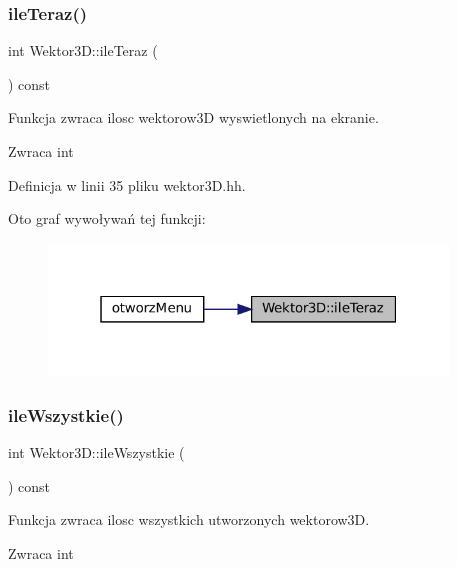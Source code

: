 \subsubsection{\texorpdfstring{ileTeraz()}{ileTeraz()}}
{\footnotesize\ttfamily int Wektor3\+D\+::ile\+Teraz (\begin{DoxyParamCaption}{ }\end{DoxyParamCaption}) const\hspace{0.3cm}{\ttfamily [inline]}}

Funkcja zwraca ilosc wektorow3D wyswietlonych na ekranie.

\begin{DoxyReturn}{Zwraca}
int 
\end{DoxyReturn}


Definicja w linii 35 pliku wektor3\+D.\+hh.

Oto graf wywoływań tej funkcji\+:\nopagebreak
\begin{figure}[H]
\begin{center}
\leavevmode
\includegraphics[width=301pt]{class_wektor3_d_a35bade70d5d9200b5e4fab3e7726f4c8_icgraph}
\end{center}
\end{figure}
\mbox{\label{class_wektor3_d_a93099f705273022e5c857dba3730d750}} 
\subsubsection{\texorpdfstring{ileWszystkie()}{ileWszystkie()}}
{\footnotesize\ttfamily int Wektor3\+D\+::ile\+Wszystkie (\begin{DoxyParamCaption}{ }\end{DoxyParamCaption}) const\hspace{0.3cm}{\ttfamily [inline]}}

Funkcja zwraca ilosc wszystkich utworzonych wektorow3D.

\begin{DoxyReturn}{Zwraca}
int 
\end{DoxyReturn}


